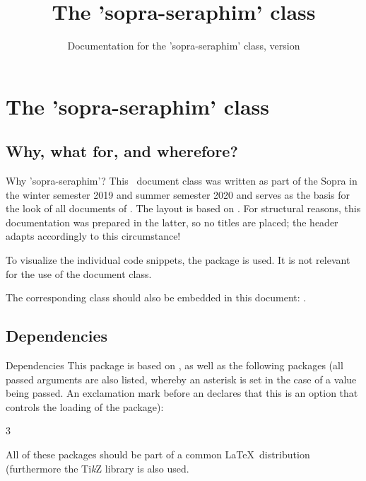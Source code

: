 \documentclass{sopra-seraphim}
\title{The 'sopra-seraphim' class}
\subtitle{Documentation for the 'sopra-seraphim' class, version \thesosversion}
\begin{document}
    \Intro

    \section{The 'sopra-seraphim' class}
    \subsection{Why, what for, and wherefore?}
    \begin{frame}{Why 'sopra-seraphim'?}
        This \LaTeXe\ document class was written as part of the Sopra in the
        winter semester 2019 and summer semester 2020 and serves as
        the basis for the look of all documents of .
        The layout is based on . For structural reasons, this documentation was prepared in the latter, so no titles are placed; the header adapts accordingly to this circumstance!\par
        To visualize the individual code snippets, the
         package is used. It is not relevant
        for the use of the document class.\par
        The corresponding class should also be embedded in this document: .
    \end{frame}

    \subsection{Dependencies}
    \begin{frame}[fragile]{Dependencies}
    This package is based on , as well as the following packages (all passed arguments are also
    listed, whereby an asterisk is set in the case of a value being passed. An exclamation mark before an  declares that this is an option that controls the loading of the package):
    \begingroup\footnotesize
    \begin{multicols}{3}
    \end{multicols}
    \endgroup
    All of these packages should be part of a common \LaTeX\ distribution (furthermore
    the Ti\textit{k}Z library  is also used.
    \end{frame}
\end{document}
